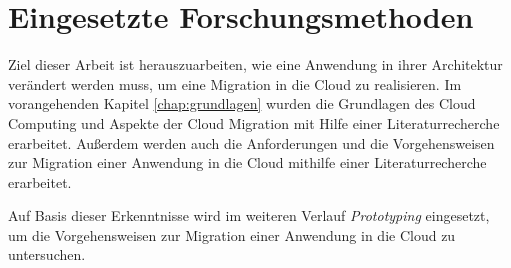 
\chapter{Eingesetzte Forschungsmethoden}
Ziel dieser Arbeit ist herauszuarbeiten, wie eine Anwendung in ihrer Architektur verändert werden muss, um eine Migration in die Cloud zu realisieren. Im vorangehenden Kapitel \ref{chap:grundlagen} wurden die Grundlagen des Cloud Computing und Aspekte der Cloud Migration mit Hilfe einer Literaturrecherche erarbeitet. Außerdem werden auch die Anforderungen und die Vorgehensweisen zur Migration einer Anwendung in die Cloud mithilfe einer Literaturrecherche erarbeitet.

Auf Basis dieser Erkenntnisse wird im weiteren Verlauf \textit{Prototyping} eingesetzt, um die Vorgehensweisen zur Migration einer Anwendung in die Cloud zu untersuchen.




